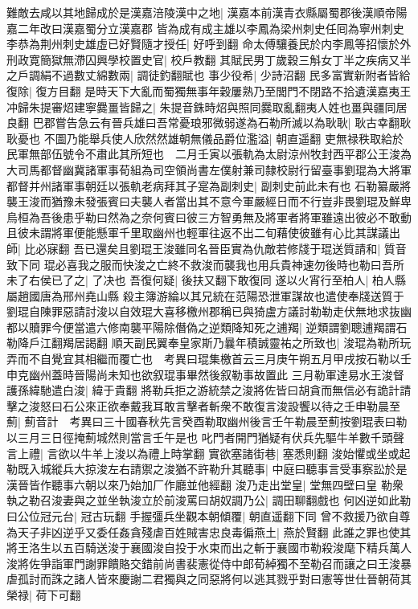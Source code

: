 難敵去咸以其地歸成於是漢嘉涪陵漢中之地|{
	漢嘉本前漢青衣縣屬蜀郡後漢順帝陽嘉二年改曰漢嘉蜀分立漢嘉郡}
皆為成有成主雄以李鳳為梁州刺史任囘為寧州刺史李恭為荆州刺史雄虛已好賢隨才授任|{
	好呼到翻}
命太傅驤養民於内李鳳等招懷於外刑政寛簡獄無滯囚興學校置史官|{
	校戶教翻}
其賦民男丁歲穀三斛女丁半之疾病又半之戶調絹不過數丈綿數兩|{
	調徒釣翻賦也}
事少役希|{
	少詩沼翻}
民多富實新附者皆給復除|{
	復方目翻}
是時天下大亂而蜀獨無事年穀屢熟乃至閭門不閉路不拾遺漢嘉夷王冲歸朱提審炤建寧爨畺皆歸之|{
	朱提音銖時炤與照同爨取亂翻夷人姓也畺與疆同居良翻}
巴郡嘗告急云有晉兵雄曰吾常憂琅邪微弱遂為石勒所滅以為耿耿|{
	耿古幸翻耿耿憂也}
不圖乃能舉兵使人欣然然雄朝無儀品爵位濫溢|{
	朝直遥翻}
吏無禄秩取給於民軍無部伍號令不肅此其所短也　二月壬寅以張軌為太尉涼州牧封西平郡公王浚為大司馬都督幽冀諸軍事荀組為司空領尚書左僕射兼司隸校尉行留臺事劉琨為大將軍都督并州諸軍事朝廷以張軌老病拜其子寔為副刺史|{
	副刺史前此未有也}
石勒纂嚴將襲王浚而猶豫未發張賓曰夫襲人者當出其不意今軍嚴經日而不行豈非畏劉琨及鮮卑烏桓為吾後患乎勒曰然為之奈何賓曰彼三方智勇無及將軍者將軍雖遠出彼必不敢動且彼未謂將軍便能懸軍千里取幽州也輕軍往返不出二旬藉使彼雖有心比其謀議出師|{
	比必寐翻}
吾已還矣且劉琨王浚雖同名晉臣實為仇敵若修牋于琨送質請和|{
	質音致下同}
琨必喜我之服而快浚之亡終不救浚而襲我也用兵貴神速勿後時也勒曰吾所未了右侯已了之|{
	了决也}
吾復何疑|{
	後扶又翻下敢復同}
遂以火宵行至柏人|{
	柏人縣屬趙國唐為邢州堯山縣}
殺主簿游綸以其兄統在范陽恐泄軍謀故也遣使奉牋送質于劉琨自陳罪惡請討浚以自效琨大喜移檄州郡稱已與猗盧方議討勒勒走伏無地求抜幽都以贖罪今便當遣六修南襲平陽除僭偽之逆類降知死之逋羯|{
	逆類謂劉聰逋羯謂石勒降戶江翻羯居謁翻}
順天副民翼奉皇家斯乃曩年積誠靈祐之所致也|{
	浚琨為勒所玩弄而不自覺宜其相繼而覆亡也　考異曰琨集檄首云三月庚午朔五月甲戌按石勒以壬申克幽州蓋時晉陽尚未知也欲叙琨事畢然後叙勒事故置此}
三月勒軍達易水王浚督護孫緯馳遣白浚|{
	緯于貴翻}
將勒兵拒之游統禁之浚將佐皆曰胡貪而無信必有詭計請擊之浚怒曰石公來正欲奉戴我耳敢言擊者斬衆不敢復言浚設饗以待之壬申勒晨至薊|{
	薊音計　考異曰三十國春秋先言癸酉勒取幽州後言壬午勒晨至薊按劉琨表曰勒以三月三日徑掩薊城然則當言壬午是也}
叱門者開門猶疑有伏兵先驅牛羊數千頭聲言上禮|{
	言欲以牛羊上浚以為禮上時掌翻}
實欲塞諸街巷|{
	塞悉則翻}
浚始懼或坐或起勒既入城縱兵大掠浚左右請禦之浚猶不許勒升其聽事|{
	中庭曰聽事言受事察訟於是漢晉皆作聽事六朝以來乃始加厂作廳並他經翻}
浚乃走出堂皇|{
	堂無四壁曰皇}
勒衆執之勒召浚妻與之並坐執浚立於前浚罵曰胡奴調乃公|{
	調田聊翻戲也}
何凶逆如此勒曰公位冠元台|{
	冠古玩翻}
手握彊兵坐觀本朝傾覆|{
	朝直遥翻下同}
曾不救援乃欲自尊為天子非凶逆乎又委任姦貪殘虐百姓賊害忠良毒徧燕土|{
	燕於賢翻}
此誰之罪也使其將王洛生以五百騎送浚于襄國浚自投于水束而出之斬于襄國市勒殺浚麾下精兵萬人浚將佐爭詣軍門謝罪饋賂交錯前尚書裴憲從侍中郎荀綽獨不至勒召而讓之曰王浚暴虐孤討而誅之諸人皆來慶謝二君獨與之同惡將何以逃其戮乎對曰憲等世仕晉朝荷其榮禄|{
	荷下可翻}

